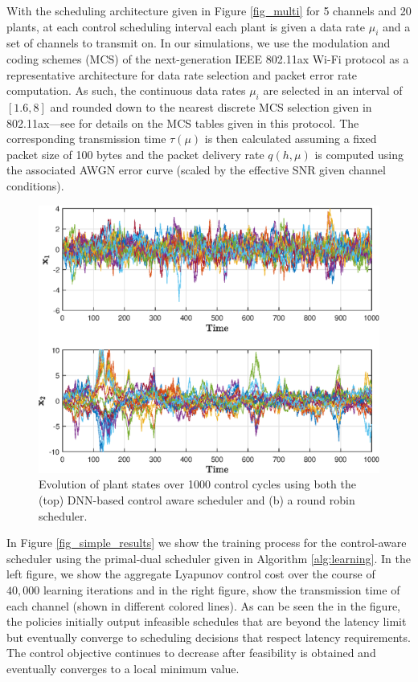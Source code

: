 \documentclass[conference,10pt]{IEEEtran}
\begin{document}
With the scheduling architecture given in Figure \ref{fig_multi} for 5 channels and 20 plants, at each control scheduling interval each plant is given a data rate $\mu_i$ and a set of channels to transmit on. In our simulations, we use the modulation and coding schemes (MCS) of the next-generation IEEE 802.11ax Wi-Fi protocol as a representative architecture for data rate selection and packet error rate computation. As such, the continuous data rates $\mu_i$ are selected in an interval of $[1.6, 8]$ and rounded down to the nearest discrete MCS selection given in 802.11ax---see \cite{liu2014ieee} for details on the MCS tables given in this protocol. The corresponding transmission time $\tau(\mu)$ is then calculated assuming a fixed packet size of 100 bytes and the packet delivery rate $q(h,\mu)$ is computed using the associated AWGN error curve (scaled by the effective SNR given channel conditions).



 \begin{figure}
\centering
\includegraphics[height=.22\textheight]{../images/system_simulation.eps}
\caption{Evolution of plant states over 1000 control cycles using both the (top) DNN-based control aware scheduler and (b) a round robin scheduler.}\label{fig_system}
\end{figure}

In Figure \ref{fig_simple_results} we show the training process for the control-aware scheduler using the primal-dual scheduler given in Algorithm \ref{alg:learning}. In the left figure, we show the aggregate Lyapunov control cost over the course of $40,000$ learning iterations and in the right figure, show the transmission time of each channel (shown in different colored lines). As can be seen the in the figure, the policies initially output infeasible schedules that are beyond the latency limit but eventually converge to scheduling decisions that respect latency requirements. The control objective continues to decrease after feasibility is obtained and eventually converges to a local minimum value.
\end{document}
